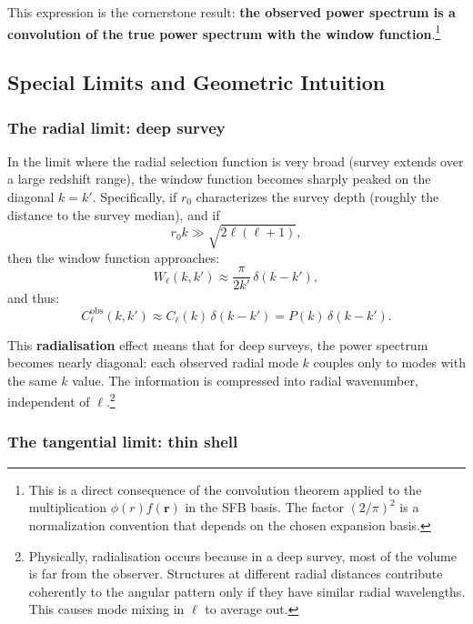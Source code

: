 This expression is the cornerstone result: \textbf{the observed power spectrum is a convolution of the true power
spectrum with the window function}.\footnote{This is a direct consequence of the convolution theorem applied to
the multiplication $\phi(r)f(\mathbf{r})$ in the SFB basis. The factor $(2/\pi)^2$ is a normalization convention
that depends on the chosen expansion basis.}

\subsection{Special Limits and Geometric Intuition}

\subsubsection{The radial limit: deep survey}

In the limit where the radial selection function is very broad (survey extends over a large redshift range), the
window function becomes sharply peaked on the diagonal $k=k'$. Specifically, if $r_0$ characterizes the survey
depth (roughly the distance to the survey median), and if
\begin{equation}
r_0 k \gg \sqrt{2\ell(\ell+1)},
\label{eq:radialisation_condition}
\end{equation}
then the window function approaches:
\begin{equation}
W_\ell(k,k') \approx \frac{\pi}{2k'}\,\delta(k-k'),
\label{eq:window_radial_limit}
\end{equation}
and thus:
\begin{equation}
C^{\text{obs}}_\ell(k,k') \approx C_\ell(k)\,\delta(k-k') = P(k)\,\delta(k-k').
\label{eq:observed_power_radial_limit}
\end{equation}

This \textbf{radialisation} effect means that for deep surveys, the power spectrum becomes nearly diagonal: each
observed radial mode $k$ couples only to modes with the same $k$ value. The information is compressed into radial
wavenumber, independent of $\ell$.\footnote{Physically, radialisation occurs because in a deep survey, most of the
volume is far from the observer. Structures at different radial distances contribute coherently to the angular pattern
only if they have similar radial wavelengths. This causes mode mixing in $\ell$ to average out.}

\subsubsection{The tangential limit: thin shell}

